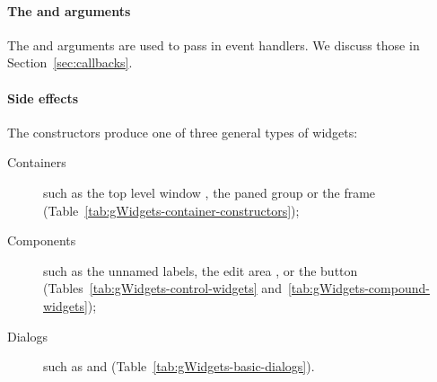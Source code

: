 \paragraph{The  and  arguments}
The  and  arguments are used to pass in
event handlers. We discuss those in Section~\ref{sec:callbacks}.


\paragraph{Side effects}
The constructors produce one of three general types of widgets:
\\

\begin{description}
\item[Containers] such as the top level window , the paned
  group  or the frame 
 (Table~\ref{tab:gWidgets-container-constructors});
%
\item[Components] such as the unnamed labels, the edit area
  , or the button 
  (Tables~\ref{tab:gWidgets-control-widgets}
  and~\ref{tab:gWidgets-compound-widgets});
%
\item[Dialogs] such as  and  (Table~\ref{tab:gWidgets-basic-dialogs}).
\end{description}








